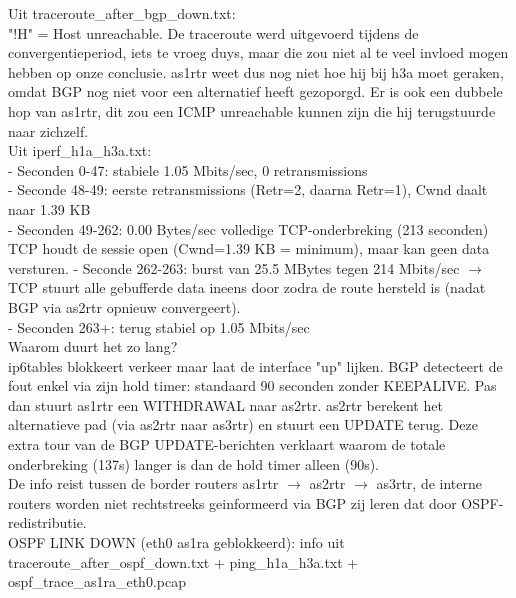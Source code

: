 Uit traceroute\_after\_bgp\_down.txt:\\

   "!H" = Host unreachable. De traceroute werd uitgevoerd tijdens de convergentieperiod, iets te vroeg duys, maar die zou niet al te veel invloed mogen hebben op onze conclusie. as1rtr weet dus nog niet hoe hij bij h3a moet geraken, omdat BGP nog niet voor een alternatief heeft gezoporgd. Er is ook een dubbele hop van as1rtr, dit zou een ICMP unreachable kunnen zijn die hij terugstuurde naar zichzelf.\\

Uit iperf\_h1a\_h3a.txt:\\

  - Seconden 0-47: stabiele 1.05 Mbits/sec, 0 retransmissions\\
  - Seconde 48-49: eerste retransmissions (Retr=2, daarna Retr=1), Cwnd daalt naar 1.39 KB\\
  - Seconden 49-262: 0.00 Bytes/sec volledige TCP-onderbreking (213 seconden)\\
    TCP houdt de sessie open (Cwnd=1.39 KB = minimum), maar kan geen data versturen.
  - Seconde 262-263: burst van 25.5 MBytes tegen 214 Mbits/sec $\rightarrow$ TCP stuurt alle gebufferde data ineens door zodra de route hersteld is (nadat BGP via as2rtr opnieuw convergeert).\\
  - Seconden 263+: terug stabiel op 1.05 Mbits/sec\\

Waarom duurt het zo lang?\\
ip6tables blokkeert verkeer maar laat de interface "up" lijken. BGP detecteert de fout
  enkel via zijn hold timer: standaard 90 seconden zonder KEEPALIVE. Pas dan stuurt as1rtr
  een WITHDRAWAL naar as2rtr. as2rtr berekent het alternatieve pad (via as2rtr naar as3rtr)
  en stuurt een UPDATE terug. Deze extra tour van de BGP UPDATE-berichten verklaart waarom
  de totale onderbreking (137s) langer is dan de hold timer alleen (90s).\\

De info reist tussen de border routers as1rtr $\rightarrow$ as2rtr $\rightarrow$ as3rtr, de interne routers worden niet rechtstreeks geinformeerd via BGP zij leren dat door OSPF-redistributie.\\

OSPF LINK DOWN (eth0 as1ra geblokkeerd):
info uit traceroute\_after\_ospf\_down.txt + ping\_h1a\_h3a.txt + ospf\_trace\_as1ra\_eth0.pcap\\

